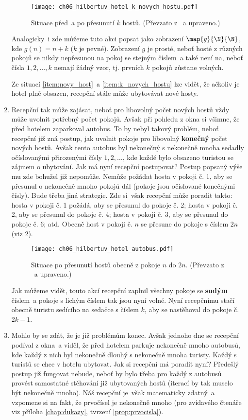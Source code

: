 \begin{enumerate}[label=\textit{(\roman*)}]
    \begin{figure}[h]
        \centering
        \texttt{[image: ch06\_hilbertuv\_hotel\_k\_novych\_hostu.pdf]}
        \caption{Situace před~a po přesunutí $k$ hostů. (Převzato z \cite{Rmoutil2022}~a upraveno.)}
        \label{fig:hilbertuv_hotel_k_novych_hostu}
    \end{figure}
    Analogicky~i zde můžeme tuto akci popsat jako zobrazení $\map{g}{\N}{\N}$, kde $g(n)=n+k$ ($k$ je pevné). Zobrazení $g$ je prosté, neboť hosté z různých pokojů se nikdy nepřesunou na pokoj se stejným číslem~a také není na, neboť čísla $1,2,\dots,k$ nemají žádný vzor, tj. prvních $k$ pokojů zůstane volných.\par
    Ze situací \ref{item:novy_host}~a \ref{item:k_novych_hostu} lze vidět, že ačkoliv je hotel plně obsazen, recepční stále může ubytovávat nové hosty.
    \item Recepční tak může zajásat, neboť pro libovolný počet nových hostů vždy může uvolnit potřebný počet pokojů. Avšak při pohledu z okna si všimne, že před hotelem zaparkoval autobus. To by nebyl takový problém, neboť recepční již zná postup, jak uvolnit pokoje pro libovolný \textbf{konečný} počet nových hostů. Avšak tento autobus byl nekonečný s nekonečně mnoha sedadly očíslovanými přirozenými čísly $1,2,\dots$, kde každé bylo obsazeno turistou se zájmem o ubytování. Jak má nyní recepční postupovat? Postup popsaný výše mu zde bohužel již nepomůže. Nemůže požádat hosta v pokoji č. 1, aby se přesunul o nekonečně mnoho pokojů dál (pokoje jsou očíslované konečnými čísly). Bude třeba jiná strategie. Zde si~však recepční může poradit takto: hosta v pokoji č. 1 požádá, aby se přesunul do pokoje č. 2; hosta v pokoji č. 2, aby se přesunul do pokoje č. 4; hosta v pokoji č. 3, aby se přesunul do pokoje č. 6; atd. Obecně host v pokoji č. $n$ se přesune do pokoje s číslem $2n$ (viz \ref{fig:hilbertuv_hotel_autobus}).
    \begin{figure}[h]
        \centering
        \texttt{[image: ch06\_hilbertuv\_hotel\_autobus.pdf]}
        \caption{Situace po přesunutí hostů obecně z pokoje $n$ do $2n$. (Převzato z \cite{Rmoutil2022}~a upraveno.)}
        \label{fig:hilbertuv_hotel_autobus}
    \end{figure}
    Jak můžeme vidět, touto akcí recepční zaplnil všechny pokoje se \textbf{sudým} číslem~a pokoje s lichým číslem tak jsou nyní volné. Nyní recepčnímu stačí obecně turistu sedícího na sedačce s číslem $k$, aby se nastěhoval do pokoje č. $2k-1$.
    \item Mohlo by se zdát, že je již problémům konec. Avšak jednoho dne se recepční podíval z okna~a viděl, že před hotelem parkuje nekonečně mnoho autobusů, kde každý z nich byl nekonečně dlouhý s nekonečně mnoha turisty. Každý s turistů se chce v hotelu ubytovat. Jak si recepční má poradit nyní? Předešlý postup již fungovat nebude, neboť by bylo třeba pro každý z autobusů provést samostatné stěhování již ubytovaných hostů (iterací by tak muselo být nekonečně mnoho). Náš recepční je~však matematicky zdatný~a vzpomene si na fakt, že prvočísel je nekonečně mnoho (pro zvídavého čtenáře viz příloha \ref{chap:dukazy}, tvrzení \ref{prop:prvocisla}).

\end{enumerate}
